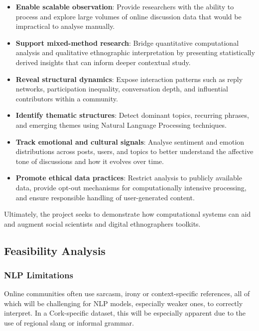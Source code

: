 \documentclass[12pt, a4paper]{article}
\begin{document}
\begin{itemize}
    \item \textbf{Enable scalable observation}: Provide researchers with the ability to process and explore large volumes of online discussion data that would be impractical to analyse manually.

    \item \textbf{Support mixed-method research}: Bridge quantitative computational analysis and qualitative ethnographic interpretation by presenting statistically derived insights that can inform deeper contextual study.

    \item \textbf{Reveal structural dynamics}: Expose interaction patterns such as reply networks, participation inequality, conversation depth, and influential contributors within a community.

    \item \textbf{Identify thematic structures}: Detect dominant topics, recurring phrases, and emerging themes using Natural Language Processing techniques.

    \item \textbf{Track emotional and cultural signals}: Analyse sentiment and emotion distributions across posts, users, and topics to better understand the affective tone of discussions and how it evolves over time.

    \item \textbf{Promote ethical data practices}: Restrict analysis to publicly available data, provide opt-out mechanisms for computationally intensive processing, and ensure responsible handling of user-generated content.
\end{itemize}

Ultimately, the project seeks to demonstrate how computational systems can aid and augment social scientists and digital ethnographers toolkits.

\subsection{Feasibility Analysis}
\subsubsection{NLP Limitations}
Online communities often use sarcasm, irony or context-specific references, all of which will be challenging for NLP models, especially weaker ones, to correctly interpret. In a Cork-specific dataset, this will be especially apparent due to the use of regional slang or informal grammar. 
\end{document}
